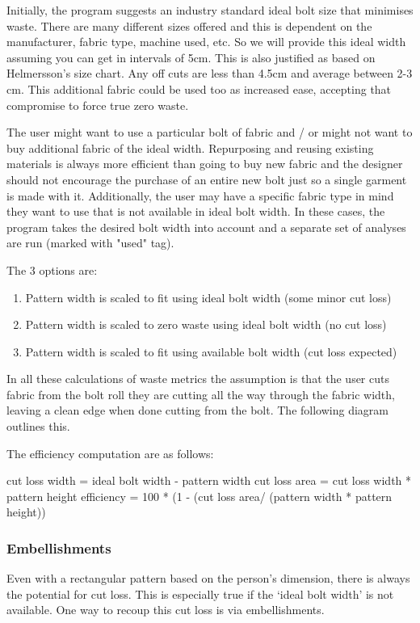 Initially, the program suggests an industry standard ideal bolt size that minimises waste. There are many different sizes offered and this is dependent on the manufacturer, fabric type, machine used, etc. So we will provide this ideal width assuming you can get in intervals of 5cm. This is also justified as based on Helmersson’s size chart. Any off cuts are less than 4.5cm and average between 2-3 cm. This additional fabric could be used too as increased ease, accepting that compromise to force true zero waste.

The user might want to use a particular bolt of fabric and / or might not want to buy additional fabric of the ideal width. Repurposing and reusing existing materials is always more efficient than going to buy new fabric and the designer should not encourage the purchase of an entire new bolt just so a single garment is made with it. Additionally, the user may have a specific fabric type in mind they want to use that is not available in ideal bolt width. In these cases, the program takes the desired bolt width into account and a separate set of analyses are run (marked with "used" tag).

The 3 options are:
\begin{enumerate}
    \item Pattern width is scaled to fit using ideal bolt width (some minor cut loss)
    \item Pattern width is scaled to zero waste using ideal bolt width (no cut loss)
    \item Pattern width is scaled to fit using available bolt width (cut loss expected)
\end{enumerate}

In all these calculations of waste metrics the assumption is that the user cuts fabric from the bolt roll they are cutting all the way through the fabric width, leaving a clean edge when done cutting from the bolt. The following diagram outlines this.

The efficiency computation are as follows:

cut loss width = ideal bolt width - pattern width \newline
cut loss area = cut loss width * pattern height \newline
efficiency = 100 * (1 - (cut loss area/ (pattern width * pattern height))


\subsubsection{Embellishments}
Even with a rectangular pattern based on the person’s dimension, there is always the potential for cut loss. This is especially true if the ‘ideal bolt width’ is not available. One way to recoup this cut loss is via embellishments.

